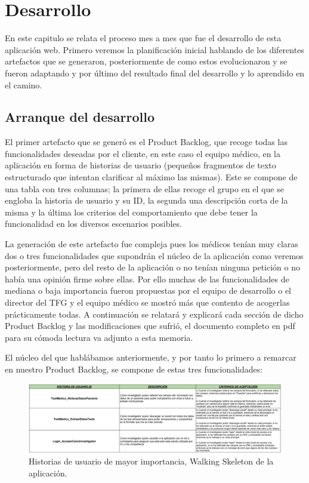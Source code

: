 \chapter{Desarrollo}

En este capitulo se relata el proceso mes a mes que fue el desarrollo de esta aplicación web. Primero veremos la planificación inicial hablando de los diferentes artefactos que se generaron, posteriormente de como estos evolucionaron y se fueron adaptando y por último del resultado final del desarrollo y lo aprendido en el camino.

\section{Arranque del desarrollo}

El primer artefacto que se generó es el Product Backlog, que recoge todas las funcionalidades deseadas por el cliente, en este caso el equipo médico, en la aplicación en forma de historias de usuario (pequeños fragmentos de texto estructurado que intentan clarificar al máximo las mismas). Este se compone de una tabla con tres columnas; la primera de ellas recoge el grupo en el que se engloba la historia de usuario y su ID, la segunda una descripción corta de la misma y la última los criterios del comportamiento que debe tener la funcionalidad en los diversos escenarios posibles.
\newline

La generación de este artefacto fue compleja pues los médicos tenían muy claras dos o tres funcionalidades que supondrán el núcleo de la aplicación como veremos posteriormente, pero del resto de la aplicación o no tenían ninguna petición o no había una opinión firme sobre ellas. Por ello muchas de las funcionalidades de mediana o baja importancia fueron propuestas por el equipo de desarrollo o el director del TFG y el equipo médico se mostró más que contento de acogerlas prácticamente todas. A continuación se relatará y explicará cada sección de dicho Product Backlog y las modificaciones que sufrió, el documento completo en pdf para su cómoda lectura va adjunto a esta memoria.
\newpage

El núcleo del que hablábamos anteriormente, y por tanto lo primero a remarcar en nuestro Product Backlog, se compone de estas tres funcionalidades:
\newline

 \begin{figure}[h]
    \centering
     \includegraphics[width=1\textwidth]{images/historiasUsuario-1.jpg}
    \caption{Historias de usuario de mayor importancia, Walking Skeleton de la aplicación.}
\end{figure}



